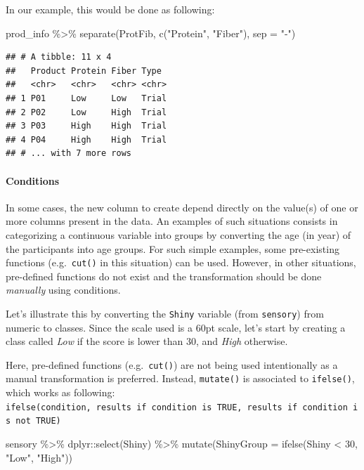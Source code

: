 \documentclass[
]{krantz}
\makeatletter
\newenvironment{Shaded}{\begin{snugshade}}{\end{snugshade}}
\newcommand{\AttributeTok}[1]{\textcolor[rgb]{0.61,0.61,0.61}{#1}}
\newcommand{\DecValTok}[1]{\textcolor[rgb]{0.06,0.06,0.06}{#1}}
\newcommand{\FunctionTok}[1]{\textcolor[rgb]{0,0,0}{#1}}
\newcommand{\NormalTok}[1]{#1}
\newcommand{\SpecialCharTok}[1]{\textcolor[rgb]{0,0,0}{#1}}
\newcommand{\StringTok}[1]{\textcolor[rgb]{0.5,0.5,0.5}{#1}}
\newenvironment{kframe}{%
\medskip{}
\setlength{\fboxsep}{.8em}
 \def\at@end@of@kframe{}%
 \ifinner\ifhmode%
  \def\at@end@of@kframe{\end{minipage}}%
  \begin{minipage}{\columnwidth}%
 \fi\fi%
 \def\FrameCommand##1{\hskip\@totalleftmargin \hskip-\fboxsep
 \colorbox{shadecolor}{##1}\hskip-\fboxsep
     \hskip-\linewidth \hskip-\@totalleftmargin \hskip\columnwidth}%
 \MakeFramed {\advance\hsize-\width
   \@totalleftmargin\z@ \linewidth\hsize
   \@setminipage}}%
 {\par\unskip\endMakeFramed%
 \at@end@of@kframe}
\renewenvironment{Shaded}{\begin{kframe}}{\end{kframe}}
\makeatother
\begin{document}
In our example, this would be done as following:

\begin{Shaded}
\begin{Highlighting}[]
\NormalTok{prod\_info }\SpecialCharTok{\%\textgreater{}\%}
  \FunctionTok{separate}\NormalTok{(ProtFib, }\FunctionTok{c}\NormalTok{(}\StringTok{"Protein"}\NormalTok{, }\StringTok{"Fiber"}\NormalTok{), }\AttributeTok{sep =} \StringTok{"{-}"}\NormalTok{)}
\end{Highlighting}
\end{Shaded}

\begin{verbatim}
## # A tibble: 11 x 4
##   Product Protein Fiber Type 
##   <chr>   <chr>   <chr> <chr>
## 1 P01     Low     Low   Trial
## 2 P02     Low     High  Trial
## 3 P03     High    High  Trial
## 4 P04     High    High  Trial
## # ... with 7 more rows
\end{verbatim}

\hypertarget{conditions}{%
\paragraph*{Conditions}\label{conditions}}

In some cases, the new column to create depend directly on the value(s) of one or more columns present in the data.
An examples of such situations consists in categorizing a continuous variable into groups by converting the age (in year) of the participants into age groups. For such simple examples, some pre-existing functions (e.g.~\texttt{cut()} in this situation) can be used.
However, in other situations, pre-defined functions do not exist and the transformation should be done \emph{manually} using conditions.

Let's illustrate this by converting the \texttt{Shiny} variable (from \texttt{sensory}) from numeric to classes.
Since the scale used is a 60pt scale, let's start by creating a class called \emph{Low} if the score is lower than 30, and \emph{High} otherwise.

Here, pre-defined functions (e.g.~\texttt{cut()}) are not being used intentionally as a manual transformation is preferred. Instead, \texttt{mutate()} is associated to \texttt{ifelse()}, which works as following: \texttt{ifelse(condition,\ results\ if\ condition\ is\ TRUE,\ results\ if\ condition\ is\ not\ TRUE)}

\begin{Shaded}
\begin{Highlighting}[]
\NormalTok{sensory }\SpecialCharTok{\%\textgreater{}\%}
\NormalTok{  dplyr}\SpecialCharTok{::}\FunctionTok{select}\NormalTok{(Shiny) }\SpecialCharTok{\%\textgreater{}\%}
  \FunctionTok{mutate}\NormalTok{(}\AttributeTok{ShinyGroup =} \FunctionTok{ifelse}\NormalTok{(Shiny }\SpecialCharTok{\textless{}} \DecValTok{30}\NormalTok{, }\StringTok{"Low"}\NormalTok{, }\StringTok{"High"}\NormalTok{))}
\end{Highlighting}
\end{Shaded}
\end{document}
